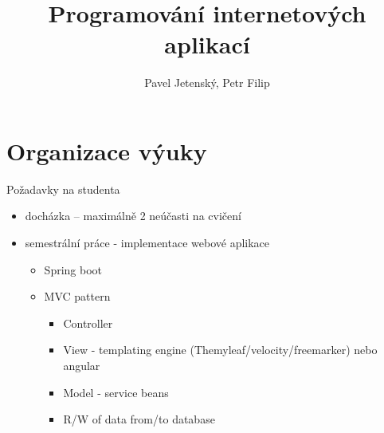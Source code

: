 \documentclass{beamer}
\author{Pavel Jetenský, Petr Filip}
\title{Programování internetových aplikací}
\institute{Univerzita Pardubice}
\begin{document}
  \maketitle

 
  
\section{Organizace výuky}
  
\begin{frame}{Požadavky na studenta}
\begin{itemize}
	\item docházka -- maximálně 2 neúčasti na cvičení
	\item semestrální práce - implementace webové aplikace
	\begin{itemize}
		\item Spring boot
		\item MVC pattern
		\begin{itemize}
		  	\item Controller
			\item View - templating engine (Themyleaf/velocity/freemarker) nebo angular
			\item Model - service beans
			\item R/W of data from/to database		   
		\end{itemize}
	\end{itemize}
\end{itemize}

\end{frame}
  
\end{document}
